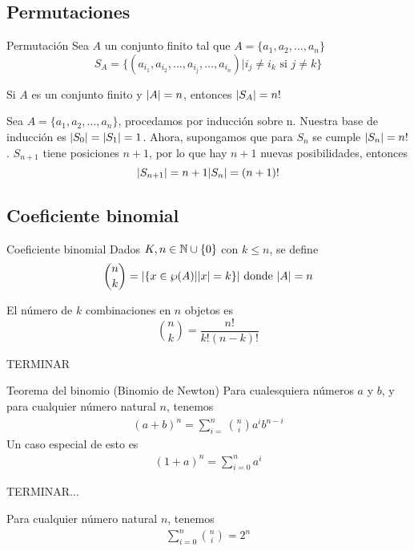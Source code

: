 	\subsection{Permutaciones}
		\begin{definition}{Permutación}
			Sea $A$ un conjunto finito tal que $A=\{a_1,a_2,\dotso,a_n\}$
			$$S_A=\{(a_{i_1},a_{i_2},\dotso,a_{i_j},\dotso,a_{i_n})|i_j\neq i_k\text{ si } j\neq k\}$$
		\end{definition}
		\begin{theorem}{}
			Si $A$ es un conjunto finito y $\abs{A}=n$, entonces $\abs{S_A}=n!$
		\end{theorem}
		\begin{demostration}{}
			Sea $A=\{a_1,a_2,\dotso,a_n\}$, procedamos por inducción sobre n.
			Nuestra base de inducción es $\abs{S_0}=\abs{S_1}=1$.
			Ahora, supongamos que para $S_n$ se cumple $\abs{S_n}=n!$.
			$S_{n+1}$ tiene posiciones $n+1$, por lo que hay $n+1$ nuevas posibilidades, entonces
			$$\abs{S_{n+1}}=n+1\abs{S_n}=(n+1)!$$
		\end{demostration}
	\subsection{Coeficiente binomial}
		\begin{definition}{Coeficiente binomial}
			Dados $K,n\in\mathbb{N}\cup\{0\}$ con $k\le n$, se define $$\binom{n}{k}=\abs{\{x\in\wp(A)|\abs{x}=k\}}\text{ donde }\abs{A}=n$$
		\end{definition}
		\begin{theorem}{}
			El número de $k$ combinaciones en $n$ objetos es
			$$\binom{n}{k}=\frac{n!}{k!(n-k)!}$$
		\end{theorem}
		\begin{demostration}{}
			TERMINAR
		\end{demostration}
		\begin{theorem}{Teorema del binomio (Binomio de Newton)}
			Para cualesquiera números $a$ y $b$, y para cualquier número natural $n$, tenemos
			\begin{align*}
				(a+b)^n=\sum_{i=}^{n}{\binom{n}{i}a^{i}b^{n-i}}
			\end{align*}
			Un caso especial de esto es 
			\begin{align*}
				(1+a)^n=\sum_{i=0}^{n}a^i
			\end{align*}
		\end{theorem}
		\begin{demostration}{}
			TERMINAR...
		\end{demostration}
		\begin{corollary}{}
			Para cualquier número natural $n$, tenemos
			\begin{align*}
				\sum_{i=0}^{n}{\binom{n}{i}}=2^n
			\end{align*}
		\end{corollary}
